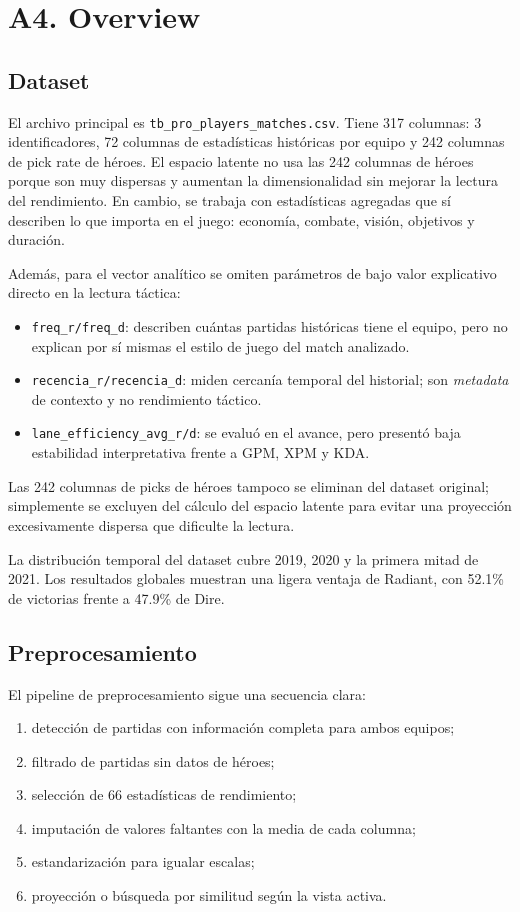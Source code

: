 \documentclass[conference]{IEEEtran}
\begin{document}
\section{A4. Overview }
\subsection{Dataset}
El archivo principal es \texttt{tb\_pro\_players\_matches.csv}. Tiene
317 columnas: 3 identificadores, 72 columnas de estad\'isticas hist\'oricas
por equipo y 242 columnas de pick rate de h\'eroes. El espacio latente no
usa las 242 columnas de héroes porque son muy dispersas y aumentan la
dimensionalidad sin mejorar la lectura del rendimiento. En cambio, se
trabaja con estad\'isticas agregadas que s\'i describen lo que importa en
el juego: econom\'ia, combate, visi\'on, objetivos y duraci\'on.

Adem\'as, para el vector anal\'itico se omiten par\'ametros de bajo valor
explicativo directo en la lectura t\'actica:
\begin{itemize}[leftmargin=*, itemsep=2pt, topsep=3pt]
  \item \texttt{freq\_r/freq\_d}: describen cu\'antas partidas hist\'oricas
  tiene el equipo, pero no explican por s\'i mismas el estilo de juego del
  match analizado.
  \item \texttt{recencia\_r/recencia\_d}: miden cercan\'ia temporal del
  historial; son \textit{metadata} de contexto y no rendimiento t\'actico.
  \item \texttt{lane\_efficiency\_avg\_r/d}: se evalu\'o en el avance,
  pero present\'o baja estabilidad interpretativa frente a GPM, XPM y KDA.
\end{itemize}

Las 242 columnas de picks de h\'eroes tampoco se eliminan del dataset
original; simplemente se excluyen del c\'alculo del espacio latente para
evitar una proyecci\'on excesivamente dispersa que dificulte la lectura.

La distribuci\'on temporal del dataset cubre 2019, 2020 y la primera
mitad de 2021. Los resultados globales muestran una ligera ventaja de
Radiant, con 52.1\% de victorias frente a 47.9\% de Dire.

\subsection{Preprocesamiento}
El pipeline de preprocesamiento sigue una secuencia clara:
\begin{enumerate}
  \item detecci\'on de partidas con informaci\'on completa para ambos equipos;
  \item filtrado de partidas sin datos de héroes;
  \item selecci\'on de 66 estad\'isticas de rendimiento;
  \item imputaci\'on de valores faltantes con la media de cada columna;
  \item estandarizaci\'on para igualar escalas;
  \item proyecci\'on o b\'usqueda por similitud seg\'un la vista activa.
\end{enumerate}
\end{document}
